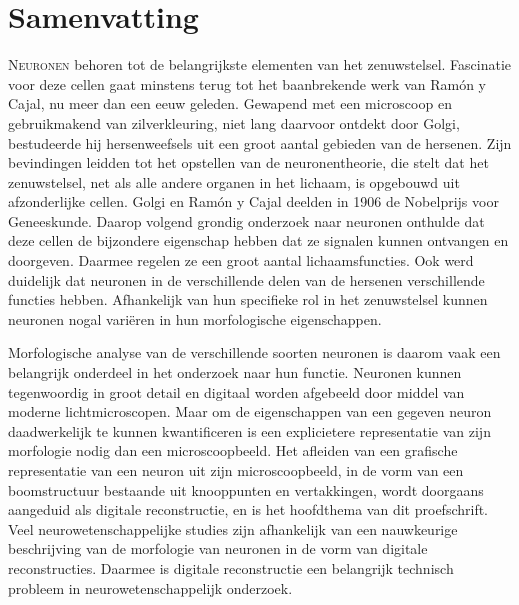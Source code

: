 %
%
\noquote
{}

\chpos{22mm}{12mm}
\chapter*{Samenvatting}

\lettrine{N}{euronen} behoren tot de belangrijkste elementen van het zenuwstelsel. Fascinatie voor deze cellen gaat minstens terug tot het baanbrekende werk van Ramón y Cajal, nu meer dan een eeuw geleden. Gewapend met een microscoop en gebruikmakend van zilverkleuring, niet lang daarvoor ontdekt door Golgi, bestudeerde hij hersenweefsels uit een groot aantal gebieden van de hersenen. Zijn bevindingen leidden tot het opstellen van de neuronentheorie, die stelt dat het zenuwstelsel, net als alle andere organen in het lichaam, is opgebouwd uit afzonderlijke cellen. Golgi en Ramón y Cajal deelden in 1906 de Nobelprijs voor Geneeskunde. Daarop volgend grondig onderzoek naar neuronen onthulde dat deze cellen de bijzondere eigenschap hebben dat ze signalen kunnen ontvangen en doorgeven. Daarmee regelen ze een groot aantal lichaamsfuncties. Ook werd duidelijk dat neuronen in de verschillende delen van de hersenen verschillende functies hebben. Afhankelijk van hun specifieke rol in het zenuwstelsel kunnen neuronen nogal variëren in hun morfologische eigenschappen.

Morfologische analyse van de verschillende soorten neuronen is daarom vaak een belangrijk onderdeel in het onderzoek naar hun functie. Neuronen kunnen tegenwoordig in groot detail en digitaal worden afgebeeld door middel van moderne lichtmicroscopen. Maar om de eigenschappen van een gegeven neuron daadwerkelijk te kunnen kwantificeren is een explicietere representatie van zijn morfologie nodig dan een microscoopbeeld. Het afleiden van een grafische representatie van een neuron uit zijn microscoopbeeld, in de vorm van een boomstructuur bestaande uit knooppunten en vertakkingen, wordt doorgaans aangeduid als digitale reconstructie, en is het hoofdthema van dit proefschrift. Veel neurowetenschappelijke studies zijn afhankelijk van een nauwkeurige beschrijving van de morfologie van neuronen in de vorm van digitale reconstructies. Daarmee is digitale reconstructie een belangrijk technisch probleem in neurowetenschappelijk onderzoek.

